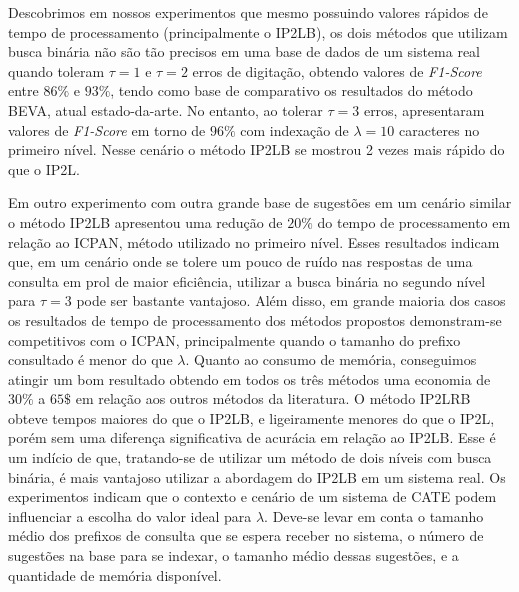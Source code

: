 Descobrimos em nossos experimentos que mesmo possuindo valores rápidos de tempo de processamento (principalmente o IP2LB), os dois métodos que utilizam busca binária não são tão precisos em uma base de dados de um sistema real quando toleram $\tau=1$ e $\tau=2$ erros de digitação, obtendo valores de \textit{F1-Score} entre $86\%$ e $93\%$, tendo como base de comparativo os resultados do método BEVA, atual estado-da-arte. No entanto, ao tolerar $\tau=3$ erros, apresentaram valores de \textit{F1-Score} em torno de $96\%$ com indexação de $\lambda=10$ caracteres no primeiro nível. Nesse cenário o método IP2LB se mostrou 2 vezes mais rápido do que o IP2L. 

Em outro experimento com outra grande base de sugestões em um cenário similar o método IP2LB apresentou uma redução de $20\%$ do tempo de processamento em relação ao ICPAN, método utilizado no primeiro nível. Esses resultados indicam que, em um cenário onde se tolere um pouco de ruído nas respostas de uma consulta em prol de maior eficiência, utilizar a busca binária no segundo nível para $\tau=3$ pode ser bastante vantajoso. Além disso, em grande maioria dos casos os resultados de tempo de processamento dos métodos propostos demonstram-se competitivos com o ICPAN, principalmente quando o tamanho do prefixo consultado é menor do que $\lambda$. Quanto ao consumo de memória, conseguimos atingir um bom resultado obtendo em todos os três métodos uma economia de $30\%$ a $65\$$ em relação aos outros métodos da literatura. O método IP2LRB obteve tempos maiores do que o IP2LB, e ligeiramente menores do que o IP2L, porém sem uma diferença significativa de acurácia em relação ao IP2LB. Esse é um indício de que, tratando-se de utilizar um método de dois níveis com busca binária, é mais vantajoso utilizar a abordagem do IP2LB em um sistema real. Os experimentos indicam que o contexto e cenário de um sistema de CATE podem influenciar a escolha do valor ideal para $\lambda$. Deve-se levar em conta o tamanho médio dos prefixos de consulta que se espera receber no sistema, o número de sugestões na base para se indexar, o tamanho médio dessas sugestões, e a quantidade de memória disponível. 

